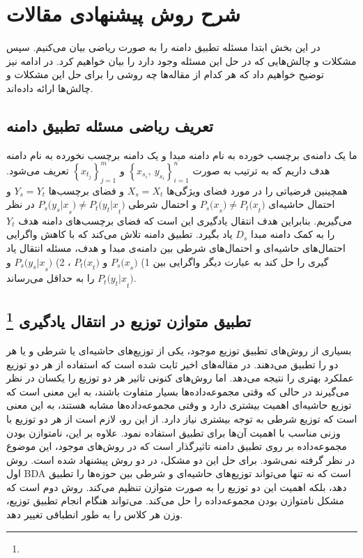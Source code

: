 \section{شرح روش پیشنهادی مقالات}
{ 	
	در این بخش ابتدا مسئله تطبیق دامنه را به صورت ریاضی بیان می‌کنیم. سپس مشکلات و چالش‌هایی که در حل این مسئله وجود دارد را بیان خواهیم کرد. در ادامه نیز توضیح خواهیم داد که هر کدام از مقاله‌ها چه روشی را برای حل این مشکلات و چالش‌ها ارائه داده‌اند.
	
	\subsection{تعریف ریاضی مسئله تطبیق دامنه}
	{
		ما یک دامنه‌ی برچسب خورده به نام دامنه مبدا و یک دامنه برچسب نخورده به نام دامنه هدف داریم که به ترتیب به  صورت 
		$\left\{x_{s_i},\ y_{s_i}\right\}_{i=1} ^ n $
		و 
		$\left\{x_{t_j}\right\}_{j=1} ^ m$
		تعریف می‌شود. همچینین فرضیاتی را در مورد فضای ویژگی‌ها
		$X_s = X_t$
		و فضای برچسب‌ها
		$Y_s=Y_t$
		و احتمال حاشیه‌ای  
		${P_s(x}_s)\neq{P_t(x}_t)$
		و احتمال شرطی
		${P_s(y_s|x}_s)\neq{P_t(y_t|x}_t)$
		در نظر می‌گیریم. بنابراین هدف انتقال یادگیری این است که فضای برچسب‌های دامنه هدف 
		$Y_t$
		را به کمک دامنه مبدا
		$D_s$
		یاد بگیرد. تطبیق دامنه تلاش می‌کند که با کاهش واگرایی احتمال‌های حاشیه‌ای و احتمال‌های شرطی  بین دامنه‌ی مبدا و هدف، مسئله انتقال یاد گیری را حل کند به عبارت دیگر واگرایی بین 1)
		${P_s(x}_s)$
		و 
		${P_t(x}_t)$
		، 2) 
		${P_s(y_s|x}_s)$
		و
		${P_t(y_t|x}_t)$
		را به حداقل می‌رساند.
	}

	\subsection{تطبیق  متوازن توزیع در انتقال یادگیری
		\protect \footnote{}}
	{
		بسیاری از روش‌های تطبیق توزیع موجود، یکی از توزیع‌های حاشیه‌ای یا شرطی و یا هر دو را تطبیق می‌دهند. در مقاله‌های اخیر ثابت شده است که استفاده از هر دو توزیع عملکرد بهتری را نتیجه می‌دهد. اما روش‌های کنونی تاثیر هر دو توزیع را یکسان در نظر می‌گیرند در حالی که وقتی مجموعه‌داده‌ها بسیار متفاوت باشند، به این معنی است که توزیع حاشیه‌ای اهمیت بیشتری دارد و وقتی مجموعه‌داده‌ها مشابه هستند، به این معنی است که توزیع شرطی به توجه بیشتری نیاز دارد. از این رو، لازم است از هر دو توزیع با وزنی مناسب با اهمیت آن‌ها برای تطبیق استفاده نمود. علاوه بر این، نامتوازن بودن مجموعه‌داده بر روی تطبیق دامنه تاثیرگذار است که در روش‌های موجود، این موضوع در نظر گرفته نمی‌شود. برای حل این دو مشکل، در
		\cite{wang2017balanced}
		دو روش پیشنهاد شده است. روش اول BDA است که نه تنها می‌تواند توزیع‌های حاشیه‌ای و شرطی بین حوزه‌ها را تطبیق دهد، بلکه اهمیت این دو توزیع را به صورت متوازن تنظیم می‌کند. روش دوم
		است که مشکل نامتوازن بودن مجموعه‌داده را حل می‌کند.
		می‌تواند هنگام انجام تطبیق توزیع، وزن هر کلاس را به طور انطباقی تغییر دهد.
}}
